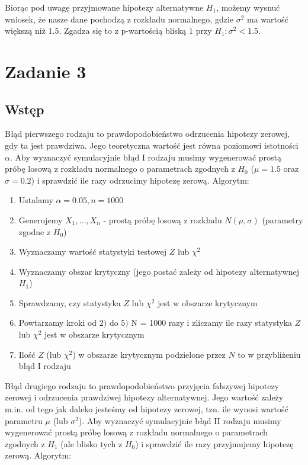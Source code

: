 \documentclass[12pt]{mwart}
\begin{document}
\noindent Biorąc pod uwagę przyjmowane hipotezy alternatywne $H_1$, możemy wysnuć wniosek, że nasze dane pochodzą z rozkładu normalnego, gdzie $\sigma^2$ ma wartość większą niż $1.5$. Zgadza się to z p-wartością bliską $1$ przy $H_1 \colon \sigma^2 <1.5$.



	\section{Zadanie 3}
	\subsection{Wstęp}
	\noindent Błąd pierwszego rodzaju to prawdopodobieństwo odrzucenia hipotezy zerowej, gdy ta jest prawdziwa. Jego teoretyczna wartość jest równa poziomowi istotności $\alpha$. Aby wyznaczyć symulacyjnie błąd I rodzaju musimy wygenerować prostą próbę losową z rozkładu normalnego o parametrach zgodnych z $H_0$ ($\mu = 1.5$ oraz $\sigma = 0.2$) i sprawdzić ile razy odrzucimy hipotezę zerową. Algorytm:
	
	\begin{enumerate}
		\itemsep 3mm
		\item Ustalamy $\alpha = 0.05, n = 1000$
		\item Generujemy $X_1, \dotsc, X_n$ - prostą próbę losową z rozkładu $N(\mu,\sigma)$ (parametry zgodne z $H_0$)
		\item Wyznaczamy wartość statystyki testowej $Z$ lub $\chi^2$
		\item Wyznaczamy obszar krytyczny (jego postać zależy od hipotezy alternatywnej $H_1$)
		\item Sprawdzamy, czy statystyka $Z$ lub $\chi^2$ jest w obszarze krytycznym
		\item Powtarzamy kroki od $2)$ do $5)$ N = 1000 razy i zliczamy ile razy statystyka $Z$ lub $\chi^2$ jest w obszarze krytycznym
		\item Ilość $Z$ (lub $\chi^2$) w obszarze krytycznym podzielone przez $N$ to w przybliżeniu błąd I rodzaju \\
	\end{enumerate}

	\noindent Błąd drugiego rodzaju to prawdopodobieństwo przyjęcia fałszywej hipotezy zerowej i odrzucenia prawdziwej hipotezy alternatywnej. Jego wartość zależy m.in. od tego jak daleko jesteśmy od hipotezy zerowej, tzn. ile wynosi wartość parametru $\mu$ (lub $\sigma^2$). Aby wyznaczyć symulacyjnie błąd II rodzaju musimy wygenerować prostą próbę losową z rozkładu normalnego o parametrach zgodnych z $H_1$ (ale blisko tych z $H_0$) i sprawdzić ile razy przyjmujemy hipotezę zerową. Algorytm:
	
\end{document}
